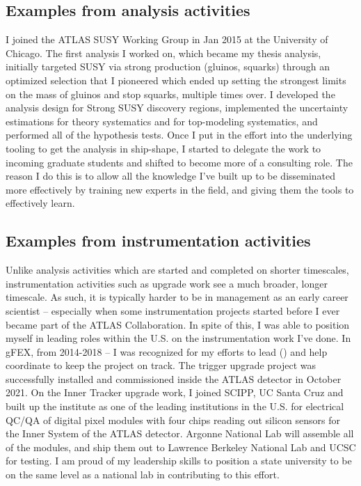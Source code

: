 \subsection{Examples from analysis activities} \label{ssec:examples-from-analysis-activities}
I joined the ATLAS SUSY Working Group in Jan 2015 at the University of Chicago. The first analysis I worked on, which became my thesis analysis, initially targeted SUSY via strong production (gluinos, squarks) through an optimized selection that I pioneered which ended up setting the strongest limits on the mass of gluinos and stop squarks, multiple times over. I developed the analysis design for Strong SUSY discovery regions, implemented the uncertainty estimations for theory systematics and for top-modeling systematics, and performed all of the hypothesis tests. Once I put in the effort into the underlying tooling to get the analysis in ship-shape, I started to delegate the work to incoming graduate students and shifted to become more of a consulting role. The reason I do this is to allow all the knowledge I've built up to be disseminated more effectively by training new experts in the field, and giving them the tools to effectively learn.

\subsection{Examples from instrumentation activities} \label{ssec:examples-from-instrumentation-activities}
Unlike analysis activities which are started and completed on shorter timescales, instrumentation activities such as upgrade work see a much broader, longer timescale. As such, it is typically harder to be in management as an early career scientist -- especially when some instrumentation projects started before I ever became part of the ATLAS Collaboration. In spite of this, I was able to position myself in leading roles within the U.S. on the instrumentation work I've done. In gFEX, from 2014-2018 -- I was recognized for my efforts to lead () and help coordinate to keep the project on track. The trigger upgrade project was successfully installed and commissioned inside the ATLAS detector in October 2021. On the Inner Tracker upgrade work, I joined SCIPP, UC Santa Cruz and built up the institute as one of the leading institutions in the U.S. for electrical QC/QA of digital pixel modules with four chips reading out silicon sensors for the Inner System of the ATLAS detector. Argonne National Lab will assemble all of the modules, and ship them out to Lawrence Berkeley National Lab and UCSC for testing. I am proud of my leadership skills to position a state university to be on the same level as a national lab in contributing to this effort.

